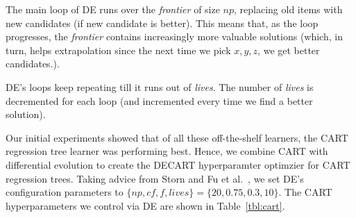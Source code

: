 \documentclass[sigconf,review,anonymous]{acmart}
\begin{document}
 
The main loop of DE runs over the {\em frontier} of size $np$, replacing old items with new candidates (if new candidate is better). This means that, as the loop progresses, the {\em frontier}  contains increasingly more valuable solutions (which, in turn,
helps   extrapolation since the next time we pick $x,y,z$, we get better candidates.). 

DE's loops keep repeating till it runs out of {\em lives}. The number of {\em lives} is decremented for each loop (and  incremented every time we find a better solution).

Our initial  experiments 
showed that of all these off-the-shelf learners, the CART regression tree learner was performing best. Hence, we combine CART with differential evolution to create the DECART hyperparamter  optimzier for CART regression trees. 
Taking advice from  Storn and Fu et al.~\cite{storn1997differential,Fu2016TuningFS}, we set DE's configuration parameters to $\{\mathit{np, cf, f, \mathit{lives}}\}=\{20,0.75,0.3,10\}$. The CART hyperparameters we control via DE are shown in Table~\ref{tbl:cart}.


 


\end{document}
